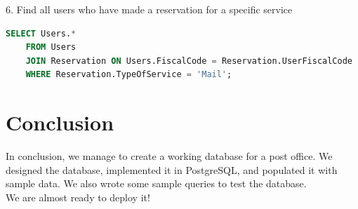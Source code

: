 \documentclass{article}
\begin{document}
6. Find all users who have made a reservation for a specific service

\begin{lstlisting}[language=SQL]
    SELECT Users.* 
    FROM Users 
    JOIN Reservation ON Users.FiscalCode = Reservation.UserFiscalCode 
    WHERE Reservation.TypeOfService = 'Mail';
\end{lstlisting}

\section{Conclusion}
In conclusion, we manage to create a working database for a post office. We designed the database, implemented it in PostgreSQL, and populated it with sample data. We also wrote some sample queries to test the database. \\
We are almost ready to deploy it!
\end{document}
